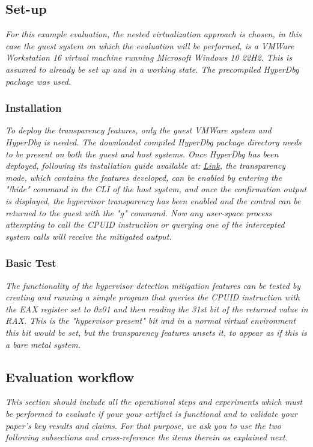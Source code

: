 \subsection{Set-up}

\textit{For this example evaluation, the nested virtualization approach is chosen, in this case the guest system on which the evaluation will be performed,
is a VMWare Workstation 16 virtual machine running Microsoft Windows 10 22H2. This is assumed to already be set up and in a working state. The precompiled HyperDbg package was used.}

\subsubsection{Installation}
\textit{To deploy the transparency features, only the guest VMWare system and HyperDbg is needed. The downloaded compiled HyperDbg package directory needs to be present on both the guest and host systems. 
Once HyperDbg has been deployed, following its installation guide available at: \href{https://docs.hyperdbg.org/getting-started/build-and-install}{Link}, the transparency mode, 
which contains the features developed, can be enabled by entering the "!hide" command in the CLI of the host system, and once the confirmation output is displayed, the hypervisor transparency has been enabled 
and the control can be returned to the guest with the "g" command. Now any user-space process attempting to call the CPUID instruction or querying one of the intercepted system calls 
will receive the mitigated output.}

\subsubsection{Basic Test}
\textit{The functionality of the hypervisor detection mitigation features can be tested by creating and running a simple program that queries the CPUID instruction with the EAX register set to 0x01
 and then reading the 31st bit of the returned value in RAX. This is the "hypervisor present" bit and in a normal virtual environment this bit would be set, but the transparency features unsets it, 
 to appear as if this is a bare metal system.}

\subsection{Evaluation workflow}
\textit{This section should include all the operational
steps and experiments which must be performed to evaluate if your your artifact is
functional and to validate your paper's key results and claims. For that
purpose, we ask you to use the two following subsections and cross-reference the
items therein as explained next.}

